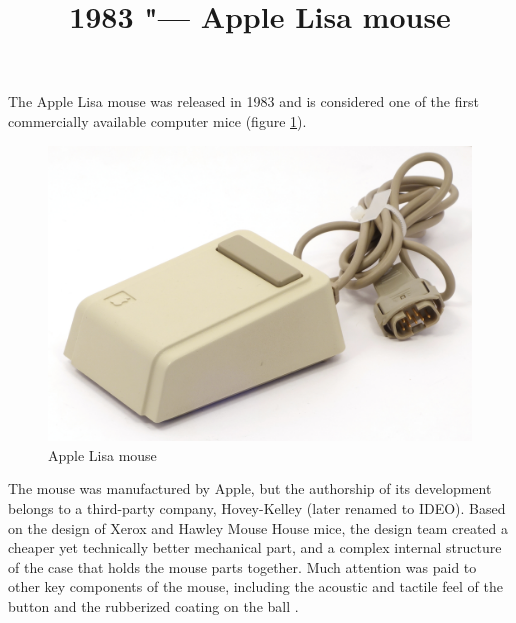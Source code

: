 \documentclass[11pt, a4paper]{article}
\begin{document}
\title{1983 "--- Apple Lisa mouse}
\date{}
\maketitle
{}
The Apple Lisa mouse was released in 1983 \cite{mouses} and is considered one of the first commercially available computer mice (figure \ref{fig:AppleLisaPic}).

\begin{figure}[h]
   \centering
    \includegraphics[scale=0.5]{1983_apple_lisa_mouse/applenorm_30.jpg}
    \caption{Apple Lisa mouse}
    \label{fig:AppleLisaPic}
\end{figure}

The mouse was manufactured by Apple, but the authorship of its development belongs to a third-party company, Hovey-Kelley (later renamed to IDEO). Based on the design of Xerox and Hawley Mouse House mice, the design team created a cheaper yet technically better mechanical part, and a complex internal structure of the case that holds the mouse parts together. Much attention was paid to other key components of the mouse, including the acoustic and tactile feel of the button and the rubberized coating on the ball \cite{ideo}.
\end{document}
